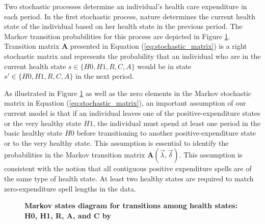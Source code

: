\documentclass[letterpaper,12pt]{article}
\theoremstyle{definition}
\begin{document}
\begin{spacing}{1.5}{}
    Two stochastic processes determine an individual's health care expenditure in each period. In the first stochastic process, nature determines the current health state of the individual based on her health state in the previous period. The Markov transition probabilities for this process are depicted in Figure \ref{FigMarkovProcess}. Transition matrix $\textbf{A}$ presented in Equation (\ref{eq:stochastic_matrix}) is a right stochastic matrix and represents the probability that an individual who are in the current health state $s \in \{H0, H1, R, C, A\}$ would be in state $s' \in \{H0, H1, R, C, A\}$ in the next period.
    
    As illustrated in Figure \ref{FigMarkovProcess} as well as the zero elements in the Markov stochastic matrix in Equation (\ref{eq:stochastic_matrix}), an important assumption of our current model is that if an individual leaves one of the positive-expenditure states or the very healthy state $H1$, the individual must spend at least one period in the basic healthy state $H0$ before transitioning to another positive-expenditure state or to the very healthy state. This assumption is essential to identify the probabilities in the Markov transition matrix $\textbf{A}(\vec{\lambda}, \vec{\delta})$. This assumption is consistent with the notion that all contiguous positive expenditure spells are of the same type of health state. At least two healthy states are required to match zero-expenditure spell lengths in the data.
    
  \begin{figure}[h!]\centering \captionsetup{width=4.0in}
    \caption{\label{FigMarkovProcess}\textbf{Markov states diagram for transitions among health states: H0, H1, R, A, and C by \citet{evans}}}
  \end{figure}
  

\end{spacing}
\end{document}
